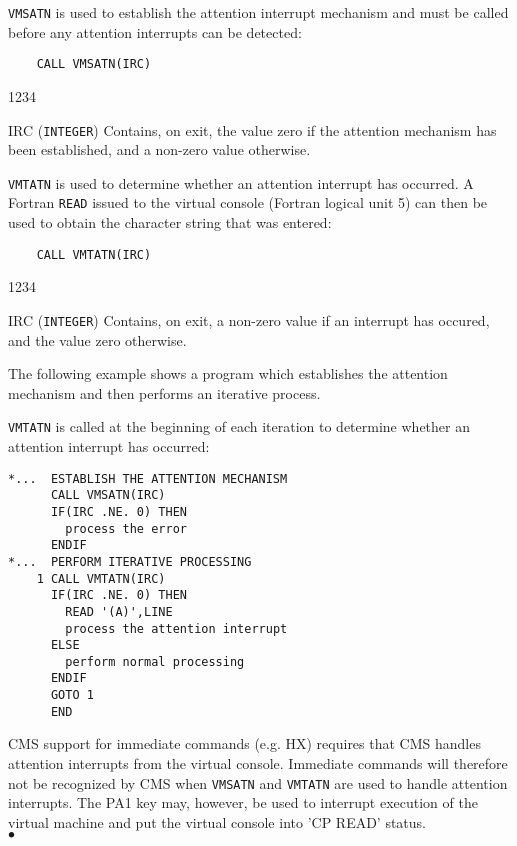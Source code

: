 {\tt VMSATN} is used to establish the attention interrupt
mechanism and must be called before any attention
interrupts can be detected:
\begin{verbatim}
    CALL VMSATN(IRC)
\end{verbatim}
\begin{DLtt}{1234}
\item[IRC] ({\tt INTEGER}) Contains, on exit, the value zero if the
attention mechanism has been established, and a non-zero value otherwise.
\end{DLtt}
{\tt VMTATN} is used to determine whether an attention
interrupt has occurred. A Fortran {\tt READ} issued to the
virtual console (Fortran logical unit 5) can then be used
to obtain the character string that was entered:
\begin{verbatim}
    CALL VMTATN(IRC)
\end{verbatim}
\begin{DLtt}{1234}
\item[IRC] ({\tt INTEGER}) Contains, on exit, a non-zero
value if an interrupt has occured, and the value zero otherwise.
\end{DLtt}
\Examples
The following example shows a program which establishes the
attention mechanism and then performs an iterative process.
\par
{\tt VMTATN} is called at the beginning of each iteration
to determine whether an attention interrupt has occurred:
\begin{verbatim}
*...  ESTABLISH THE ATTENTION MECHANISM
      CALL VMSATN(IRC)
      IF(IRC .NE. 0) THEN
        process the error
      ENDIF
*...  PERFORM ITERATIVE PROCESSING
    1 CALL VMTATN(IRC)
      IF(IRC .NE. 0) THEN
        READ '(A)',LINE
        process the attention interrupt
      ELSE
        perform normal processing
      ENDIF
      GOTO 1
      END
\end{verbatim}
\Restrict
CMS support for immediate commands (e.g. HX) requires that CMS
handles attention interrupts from the virtual console. Immediate
commands will therefore not be recognized by CMS when {\tt VMSATN} and
{\tt VMTATN} are used to handle attention interrupts. The PA1 key may,
however, be used to interrupt execution of the virtual machine and
put the virtual console into 'CP READ' status.
\\ $\bullet$
